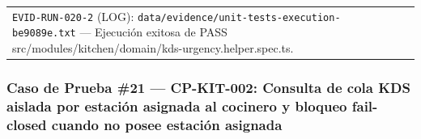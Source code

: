 \documentclass[10pt,a4paper]{article}
\begin{document}
{\begin{longtable}[]{@{}
  >{\raggedright\arraybackslash}p{}
  >{\raggedright\arraybackslash}p{}@{}}
\begin{minipage}[t]{\linewidth}
\texttt{EVID-{}\allowbreak{}RUN-{}\allowbreak{}020-{}\allowbreak{}2} (LOG): \texttt{data/\allowbreak{}evidence/\allowbreak{}unit-{}\allowbreak{}tests-{}\allowbreak{}execution-{}\allowbreak{}be9089e.\allowbreak{}txt} --- Ejecución exitosa de PASS src/modules/kitchen/domain/kds-urgency.helper.spec.ts.\strut
\end{minipage} \\
\end{longtable}
}

\endgroup\medskip


\subsubsection{Caso de Prueba \#21 --- CP-KIT-002: Consulta de cola KDS aislada por estación asignada al cocinero y bloqueo fail-closed cuando no posee estación asignada}\label{caso-de-prueba-21--cp-kit-002-consulta-de-cola-kds-aislada-por-estaciuxf3n-asignada-al-cocinero-y-bloqueo-fail-closed-cuando-no-posee-estaciuxf3n-asignada}

\begingroup\singlespacing\footnotesize\setlength{\parskip}{0pt}
\end{document}
